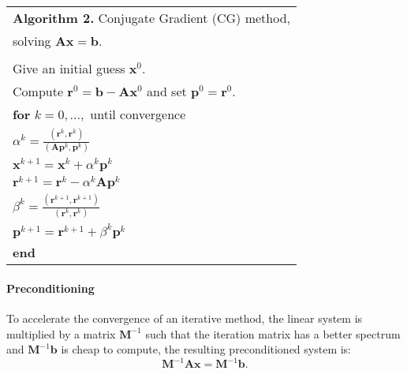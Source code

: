 \documentclass[times,final]{elsarticle}
\begin{document}
\begin{minipage}{0.9\textwidth}
\vspace{0.2cm}
\begin{tabular}{ |l| } 
\hline
 \textbf{Algorithm 2.} Conjugate Gradient (CG) method,\\ solving $\mathbf{A}\mathbf{x}=\mathbf{b}$.\\
 \hline
\\
Give an initial guess $\mathbf{x}^0$. \\Compute $\mathbf{r}^0=\mathbf{b}-\mathbf{A}\mathbf{x}^0$ and set $\mathbf{p}^0=\mathbf{r}^0$.\\

\hspace{0.5cm}\textbf{for} $k=0,...,$ until convergence\\
\hspace{1cm} $\alpha^k=\frac{(\mathbf{r}^{k},\mathbf{r}^{k})}{(\mathbf{A}\mathbf{p}^k,\mathbf{p}^k)}$\\
\hspace{1cm} $\mathbf{x}^{k+1}=\mathbf{x}^k+\alpha^k\mathbf{p}^k$\\
\hspace{1cm}$\mathbf{r}^{k+1}=\mathbf{r}^k-\alpha^k\mathbf{A}\mathbf{p}^k$\\
\hspace{1cm}$ \beta^k=\frac{(\mathbf{r}^{k+1},\mathbf{r}^{k+1})}{(\mathbf{r}^k,\mathbf{r}^k)}$\\
\hspace{1cm}$\mathbf{p}^{k+1}=\mathbf{r}^{k+1}+\beta^k\mathbf{p}^k$\\
\hspace{0.5cm}\textbf{end}\\
\hline
\end{tabular}
\end{minipage}

\paragraph{Preconditioning} To accelerate the convergence of an iterative method, the linear system is multiplied by a matrix $\mathbf{M}^{-1}$ such that the iteration matrix has a better spectrum and $\mathbf{M}^{-1}\mathbf{b}$ is cheap to compute, the resulting  preconditioned system is:
\begin{equation}\label{eq:precon}
 \mathbf{M}^{-1}\mathbf{A}\mathbf{x}=\mathbf{M}^{-1}\mathbf{b}.
\end{equation}
\end{document}
